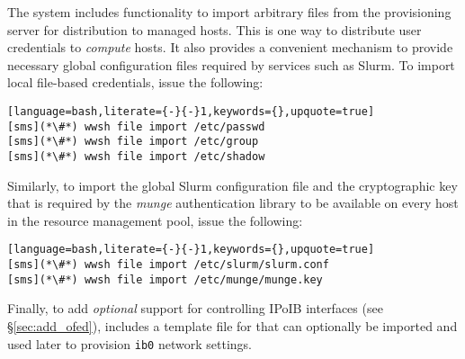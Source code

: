The \Warewulf{} system includes functionality to import arbitrary files from
the provisioning server for distribution to managed hosts. This is one way to
distribute user credentials to {\em compute} hosts. It also provides a
convenient mechanism to provide necessary global configuration files required
by services such as Slurm. To import local file-based credentials, issue the
following:

\begin{lstlisting}[language=bash,literate={-}{-}1,keywords={},upquote=true]
[sms](*\#*) wwsh file import /etc/passwd
[sms](*\#*) wwsh file import /etc/group
[sms](*\#*) wwsh file import /etc/shadow 

\end{lstlisting}

\noindent Similarly, to import the global Slurm configuration file and the cryptographic
key that is required by the {\em munge} authentication library to be available
on every host in the resource management pool, issue the following:

\begin{lstlisting}[language=bash,literate={-}{-}1,keywords={},upquote=true]
[sms](*\#*) wwsh file import /etc/slurm/slurm.conf
[sms](*\#*) wwsh file import /etc/munge/munge.key
\end{lstlisting}

\noindent Finally, to add {\em optional} support for controlling IPoIB
interfaces (see \S\ref{sec:add_ofed}), \OHPC{} includes a
template file for \Warewulf{} that can optionally be imported and used later to provision
\texttt{ib0} network settings.
